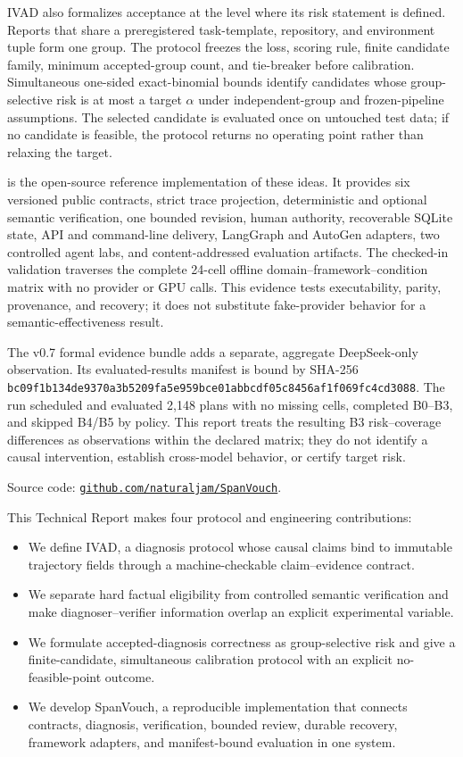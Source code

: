 IVAD also formalizes acceptance at the level where its risk statement is
defined. Reports that share a preregistered task-template, repository, and
environment tuple form one group. The protocol freezes the loss, scoring rule,
finite candidate family, minimum accepted-group count, and tie-breaker before
calibration. Simultaneous one-sided exact-binomial bounds identify candidates
whose group-selective risk is at most a target $\alpha$ under independent-group
and frozen-pipeline assumptions. The selected candidate is evaluated once on
untouched test data; if no candidate is feasible, the protocol returns no
operating point rather than relaxing the target.

\system is the open-source reference implementation of these ideas. It
provides six versioned public contracts, strict trace projection, deterministic
and optional semantic verification, one bounded revision, human authority,
recoverable SQLite state, API and command-line delivery, LangGraph and AutoGen
adapters, two controlled agent labs, and content-addressed evaluation
artifacts. The checked-in validation traverses the complete 24-cell offline
domain--framework--condition matrix with no provider or GPU calls. This
evidence tests executability, parity, provenance, and recovery; it does not
substitute fake-provider behavior for a semantic-effectiveness result.

The v0.7 formal evidence bundle adds a separate, aggregate DeepSeek-only
observation. Its evaluated-results manifest is bound by SHA-256
\nolinkurl{bc09f1b134de9370a3b5209fa5e959bce01abbcdf05c8456af1f069fc4cd3088}.
The run scheduled and evaluated 2,148 plans with no missing cells, completed
B0--B3, and skipped B4/B5 by policy. This report treats the resulting B3
risk--coverage differences as observations within the declared matrix; they do
not identify a causal intervention, establish cross-model behavior, or certify
target risk.

\begin{anonsuppress}
Source code: \href{https://github.com/naturaljam/SpanVouch}
{\nolinkurl{github.com/naturaljam/SpanVouch}}.
\end{anonsuppress}

This Technical Report makes four protocol and engineering contributions:
\begin{itemize}
    \item We define IVAD, a diagnosis protocol whose causal claims bind to
    immutable trajectory fields through a machine-checkable claim--evidence
    contract.
    \item We separate hard factual eligibility from controlled semantic
    verification and make diagnoser--verifier information overlap an explicit
    experimental variable.
    \item We formulate accepted-diagnosis correctness as group-selective risk
    and give a finite-candidate, simultaneous calibration protocol with an
    explicit no-feasible-point outcome.
    \item We develop SpanVouch, a reproducible implementation that connects
    contracts, diagnosis, verification, bounded review, durable recovery,
    framework adapters, and manifest-bound evaluation in one system.
\end{itemize}

